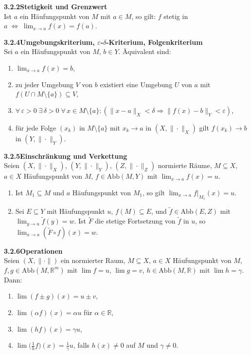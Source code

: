 \documentclass[a4paper,12pt]{article}
\newcommand{\gentry}[3]{%
  \noindent\textbf{#1\quad #2}\nopagebreak\\[0.2em]
  #3\par\smallskip
}
\begin{document}
\gentry{3.2.2}{Stetigkeit und Grenzwert}{%
  Ist $a$ ein H\"aufungspunkt von $M$ mit $a \in M$, so gilt:
  $f$ stetig in $a \;\Leftrightarrow\; \lim_{x \to a} f(x) = f(a)$.
}

\gentry{3.2.4}{Umgebungskriterium, $\varepsilon$-$\delta$-Kriterium, Folgenkriterium}{%
  Sei $a$ ein H\"aufungspunkt von $M$, $b \in Y$. \"Aquivalent sind:
  \begin{enumerate}[label=(\roman*),topsep=2pt,itemsep=1pt]
    \item $\lim_{x \to a} f(x) = b$,
    \item zu jeder Umgebung $V$ von $b$ existiert eine Umgebung $U$ von $a$ mit
          $f(U \cap M \setminus \{a\}) \subseteq V$,
    \item $\forall\, \varepsilon > 0 \; \exists\, \delta > 0 \; \forall\, x \in M \setminus \{a\}:
          (\|x - a\|_X < \delta \Rightarrow \|f(x) - b\|_Y < \varepsilon)$,
    \item f\"ur jede Folge $(x_k)$ in $M \setminus \{a\}$ mit $x_k \to a$ in $(X, \|\cdot\|_X)$
          gilt $f(x_k) \to b$ in $(Y, \|\cdot\|_Y)$.
  \end{enumerate}
}

\gentry{3.2.5}{Einschr\"ankung und Verkettung}{%
  Seien $(X, \|\cdot\|_X)$, $(Y, \|\cdot\|_Y)$, $(Z, \|\cdot\|_Z)$ normierte R\"aume,
  $M \subseteq X$, $a \in X$ H\"aufungspunkt von $M$, $f \in \mathrm{Abb}(M, Y)$ mit
  $\lim_{x \to a} f(x) = u$.
  \begin{enumerate}[label=(\roman*),topsep=2pt,itemsep=1pt]
    \item Ist $M_1 \subseteq M$ und $a$ H\"aufungspunkt von $M_1$, so gilt
          $\lim_{x \to a} f|_{M_1}(x) = u$.
    \item Sei $E \subseteq Y$ mit H\"aufungspunkt $u$, $f(M) \subseteq E$, und
          $\tilde f \in \mathrm{Abb}(E, Z)$ mit $\lim_{y \to u} \tilde f(y) = w$.
          Ist $\tilde F$ die stetige Fortsetzung von $\tilde f$ in $u$, so
          $\lim_{x \to a}(\tilde F \circ f)(x) = w$.
  \end{enumerate}
}

\gentry{3.2.6}{Operationen}{%
  Seien $(X, \|\cdot\|)$ ein normierter Raum, $M \subseteq X$, $a \in X$
  H\"aufungspunkt von $M$, $f, g \in \mathrm{Abb}(M, \mathbb{R}^m)$ mit
  $\lim f = u$, $\lim g = v$, $h \in \mathrm{Abb}(M, \mathbb{R})$ mit
  $\lim h = \gamma$. Dann:
  \begin{enumerate}[label=(\roman*),topsep=2pt,itemsep=1pt]
    \item $\lim(f \pm g)(x) = u \pm v$,
    \item $\lim(\alpha f)(x) = \alpha u$ f\"ur $\alpha \in \mathbb{R}$,
    \item $\lim(h f)(x) = \gamma u$,
    \item $\lim\bigl(\tfrac{1}{h} f\bigr)(x) = \tfrac{1}{\gamma} u$, falls $h(x) \neq 0$ auf $M$ und $\gamma \neq 0$.
  \end{enumerate}
}
\end{document}
